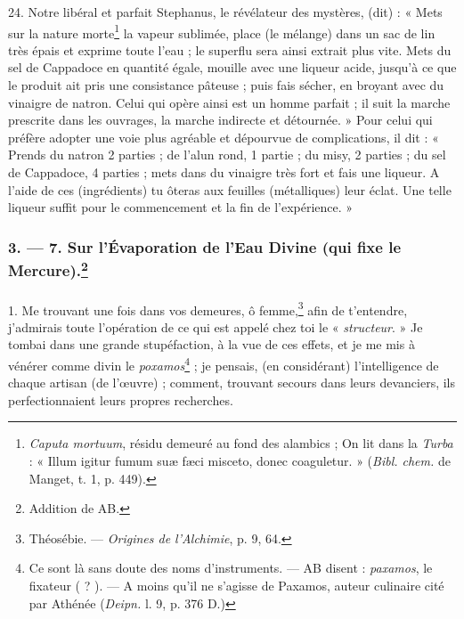 \documentclass[a4paper, 11pt, oneside, polutonikogreek, french]{article}
\begin{document}
24. Notre libéral et parfait Stephanus, le révélateur des mystères, (dit) : « Mets sur la nature morte\footnote{\emph{Caputa mortuum}, résidu demeuré au fond des alambics ; On lit dans la \emph{Turba} : « Illum igitur fumum suæ fæci misceto, donec coaguletur. » (\emph{Bibl. chem.} de Manget, t. 1, p. 449).} la vapeur sublimée, place (le mélange) dans un sac de lin très épais et exprime toute l'eau ; le superflu sera ainsi extrait plus vite. Mets du sel de Cappadoce en quantité égale, mouille avec une liqueur acide, jusqu'à ce que le produit ait pris une consistance pâteuse ; puis fais sécher, en broyant avec du vinaigre de natron. Celui qui opère ainsi est un homme parfait ; il suit la marche prescrite dans les ouvrages, la marche indirecte et détournée. » Pour celui qui préfère adopter une voie plus agréable et dépourvue de complications, il dit : « Prends du natron 2 parties ; de l'alun rond, 1 partie ; du misy, 2 parties ; du sel de Cappadoce, 4 parties ; mets dans du vinaigre très fort et fais une liqueur. A l'aide de ces (ingrédients) tu ôteras aux feuilles (métalliques) leur éclat. Une telle liqueur suffit pour le commencement et la fin de l'expérience. »

\bigskip
\centerline{\EightStarTaper}
\centerline{\EightStarTaper\EightStarTaper}
\bigskip

\subsubsection[3. --- 7. Sur l'Évaporation de l'Eau Divine (qui fixe le Mercure).]{3. --- 7. Sur l'Évaporation de l'Eau Divine (qui fixe le Mercure).\footnote{Addition de AB.}}
\paragraph{}
1. Me trouvant une fois dans vos demeures, ô femme,\footnote{Théosébie. --- \emph{Origines de l'Alchimie}, p. 9, 64.} afin de t'entendre, j'admirais toute l'opération de ce qui est appelé chez toi le « \emph{structeur}. » Je tombai dans une grande stupéfaction, à la vue de ces effets, et je me mis à vénérer comme divin le \emph{poxamos}\footnote{Ce sont là sans doute des noms d'instruments. --- AB disent : \emph{paxamos}, le fixateur ( ? ). --- A moins qu'il ne s'agisse de Paxamos, auteur culinaire cité par Athénée (\emph{Deipn.} l. 9, p. 376 D.)} ; je pensais, (en considérant) l'intelligence de chaque artisan (de l'œuvre) ; comment, trouvant secours dans leurs devanciers, ils perfectionnaient leurs propres recherches.
\end{document}
